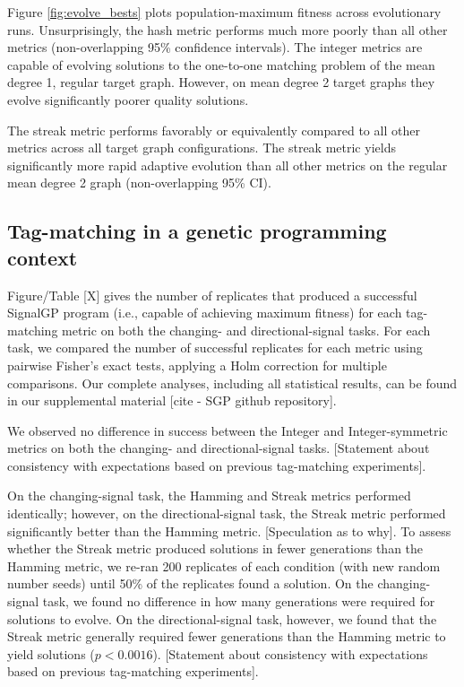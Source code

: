 

Figure \ref{fig:evolve_bests} plots population-maximum fitness across evolutionary runs.
Unsurprisingly, the hash metric performs much more poorly than all other metrics (non-overlapping 95\% confidence intervals).
The integer metrics are capable of evolving solutions to the one-to-one matching problem of the mean degree 1, regular target graph.
However, on mean degree 2 target graphs they evolve significantly poorer quality solutions.

The streak metric performs favorably or equivalently compared to all other metrics across all target graph configurations.
The streak metric yields significantly more rapid adaptive evolution than all other metrics on the regular mean degree 2 graph (non-overlapping 95\% CI).

\subsection{Tag-matching in a genetic programming context}

Figure/Table [X] gives the number of replicates that produced a successful SignalGP program (i.e., capable
of achieving maximum fitness) for each tag-matching metric on both the changing- and directional-signal
tasks.
For each task, we compared the number of successful replicates for each metric using pairwise Fisher's
exact tests, applying a Holm correction for multiple comparisons.
Our complete analyses, including all statistical results, can be found in our supplemental material
[cite - SGP github repository].

We observed no difference in success between the Integer and Integer-symmetric metrics on both the
changing- and directional-signal tasks.
[Statement about consistency with expectations based on previous tag-matching experiments].

On the changing-signal task, the Hamming and Streak metrics performed identically; however, on the directional-signal
task, the Streak metric performed significantly better than the Hamming metric.
[Speculation as to why].
To assess whether the Streak metric produced solutions in fewer generations than the Hamming metric,
we re-ran 200 replicates of each condition (with new random number seeds) until 50\% of the replicates
found a solution.
On the changing-signal task, we found no difference in how many generations were required for solutions
to evolve.
On the directional-signal task, however, we found that the Streak metric generally required fewer generations
than the Hamming metric to yield solutions ($p < 0.0016$).
[Statement about consistency with expectations based on previous tag-matching experiments].

